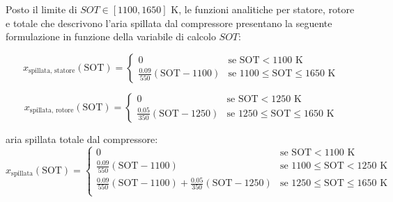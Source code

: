 Posto il limite di $SOT \in [1100,1650] \text{ K}$, le funzioni analitiche per statore, rotore e totale che descrivono l'aria spillata dal compressore presentano la seguente formulazione in funzione della variabile di calcolo $SOT$:

\begin{equation*}
x_{\text{spillata, statore}}(\text{SOT}) = \begin{cases} 
0 & \text{se } \text{SOT} < 1100 \text{ K} \\ 
\frac{0.09}{550}(\text{SOT} - 1100) & \text{se } 1100 \le \text{SOT} \le 1650 \text{ K} 
\end{cases}
\end{equation*}

\begin{equation*}
x_{\text{spillata, rotore}}(\text{SOT}) = \begin{cases} 
0 & \text{se } \text{SOT} < 1250 \text{ K} \\ 
\frac{0.05}{350}(\text{SOT} - 1250) & \text{se } 1250 \le \text{SOT} \le 1650 \text{ K} \end{cases}
\end{equation*}

aria spillata totale dal compressore:
\begin{equation*}
x_{\text{spillata}}(\text{SOT}) = \begin{cases} 
0 & \text{se } \text{SOT} < 1100 \text{ K} \\ 
\frac{0.09}{550}(\text{SOT} - 1100) & \text{se } 1100 \le \text{SOT} < 1250 \text{ K} \\ 
\frac{0.09}{550}(\text{SOT} - 1100) + \frac{0.05}{350}(\text{SOT} - 1250) & \text{se } 1250 \le \text{SOT} \le 1650 \text{ K} \\ 
\end{cases}
\end{equation*}